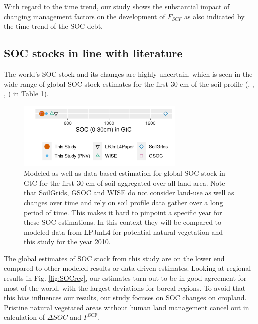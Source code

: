 \documentclass[gc, manuscript]{copernicus}
\begin{document}
With regard to the time trend, our study shows the substantial impact of changing management factors on the development of \(F_{SCF}\) as also indicated by the time trend of the SOC debt.

\hypertarget{soc-stocks-in-line-with-literature}{%
\subsection{SOC stocks in line with literature}\label{soc-stocks-in-line-with-literature}}

The world's SOC stock and its changes are highly uncertain, which is seen in the wide range of global SOC stock estimates for the first 30 cm of the soil profile (\citep{batjes_harmonized_2016}, \citep{hengl_soilgrids250m_2017}, \citep{fao_global_2018}, \citep{schaphoff_lpjml4_2018-1}) in Table \ref{fig:SOCglo}).

\begin{figure}[h]
\includegraphics[width=8cm]{../ResultNotebooks/Output/Images/glo_comparisonfigure} \caption{Modeled as well as data based estimation for global SOC stock in GtC for the first 30 cm of soil aggregated over all land area. Note that SoilGrids, GSOC and WISE do not consider land-use as well as changes over time and rely on soil profile data gather over a long period of time. This makes it hard to pinpoint a specific year for these SOC estimations. In this context they will be compared to modeled data from LPJmL4 for potential natural vegetation and this study for the year 2010.}\label{fig:SOCglo}
\end{figure}

The global estimates of SOC stock from this study are on the lower end compared to other modeled results or data driven estimates. Looking at regional results in Fig. \ref{fig:SOCreg}, our estimates turn out to be in good agreement for most of the world, with the largest deviations for boreal regions. To avoid that this bias influences our results, our study focuses on SOC changes on cropland. Pristine natural vegetated areas without human land management cancel out in calculation of \(\Delta SOC\) and \(F^\mathrm{SCF}\).
\end{document}
